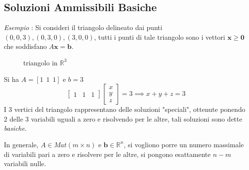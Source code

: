 \documentclass[10pt, letterpaper]{report}
\begin{document}
\subsection{Soluzioni Ammissibili Basiche}
\textit{Esempio} : Si consideri il triangolo delineato dai punti $(0,0,3),(0,3,0),(3,0,0)$, tutti i punti di tale triangolo sono i vettori $\mathbf x\ge \mathbf 0$ che soddisfano $A\mathbf x = \mathbf b$.\begin{figure}[h]
    \caption{triangolo in $\mathbb R^3$}
\end{figure}
Si ha $A=[1 \ \ 1 \ \ 1]$ e $b=3$
$$ \begin{bmatrix}
    1 & 1 & 1
\end{bmatrix}\begin{bmatrix}
    x \\ y \\ z
\end{bmatrix}=3\implies x+y+z=3$$
I 3 vertici del triangolo rappresentano delle soluzioni "speciali", ottenute ponendo 2 delle 3 variabili uguali a zero e risolvendo per le altre, tali soluzioni sono dette \textit{basiche}.\bigskip 

In generale, $A\in Mat(m\times n)$ e $\mathbf b \in \mathbb R^n$, si vogliono porre un numero massimale di variabili pari a zero e risolvere per le altre, si pongono esattamente $n-m$ variabili nulle. 
\end{document}
